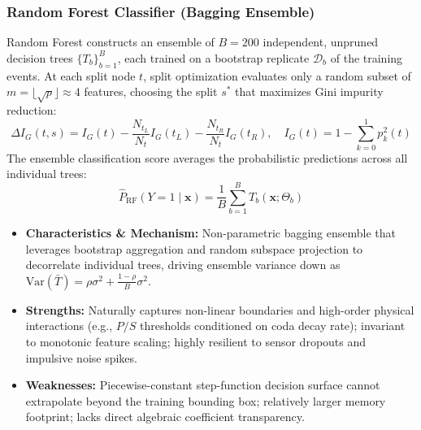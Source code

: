 \documentclass[11pt,a4paper]{article}
\begin{document}
\subsubsection{Random Forest Classifier (Bagging Ensemble)}
Random Forest constructs an ensemble of $B = 200$ independent, unpruned decision trees $\{T_b\}_{b=1}^B$, each trained on a bootstrap replicate $\mathcal{D}_b$ of the training events. At each split node $t$, split optimization evaluates only a random subset of $m = \lfloor \sqrt{p} \rfloor \approx 4$ features, choosing the split $s^*$ that maximizes Gini impurity reduction:
\begin{equation*}
    \Delta I_G(t, s) = I_G(t) - \frac{N_{t_L}}{N_t} I_G(t_L) - \frac{N_{t_R}}{N_t} I_G(t_R), \quad I_G(t) = 1 - \sum_{k=0}^1 p_k^2(t)
\end{equation*}
The ensemble classification score averages the probabilistic predictions across all individual trees:
\begin{equation*}
    \hat{P}_{\text{RF}}(Y=1 \mid \mathbf{x}) = \frac{1}{B} \sum_{b=1}^B T_b(\mathbf{x}; \Theta_b)
\end{equation*}
\begin{itemize}\setlength{\itemsep}{1.5pt}\setlength{\parskip}{0pt}
    \item \textbf{Characteristics \& Mechanism:} Non-parametric bagging ensemble that leverages bootstrap aggregation and random subspace projection to decorrelate individual trees, driving ensemble variance down as $\text{Var}(\bar{T}) = \rho \sigma^2 + \frac{1-\rho}{B} \sigma^2$.
    \item \textbf{Strengths:} Naturally captures non-linear boundaries and high-order physical interactions (e.g., $P/S$ thresholds conditioned on coda decay rate); invariant to monotonic feature scaling; highly resilient to sensor dropouts and impulsive noise spikes.
    \item \textbf{Weaknesses:} Piecewise-constant step-function decision surface cannot extrapolate beyond the training bounding box; relatively larger memory footprint; lacks direct algebraic coefficient transparency.
\end{itemize}
\end{document}
